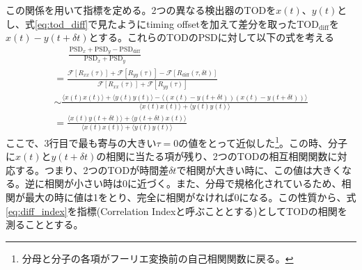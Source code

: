 この関係を用いて指標を定める。2つの異なる検出器のTODを$x(t)$、$y(t)$とし、式\eqref{eq:tod_diff}で見たようにtiming offsetを加えて差分を取った$\mathrm{TOD}_{\mathrm{diff}}$を$x(t)-y(t+\delta t)$とする。これらのTODのPSDに対して以下の式を考える
\begin{align}
  & \phantom{=}\, \frac{\mathrm{PSD}_{x} + \mathrm{PSD}_{y} - \mathrm{PSD}_{\mathrm{diff}}}{\mathrm{PSD}_{x} + \mathrm{PSD}_{y}} \label{eq:diff_index} & \\ \label{eq:diff_index2}
  & = \frac{\mathcal{F}[R_{xx}(\tau)] + \mathcal{F}[R_{yy}(\tau)] - \mathcal{F}[R_{\mathrm{diff}}(\tau,\delta t)] }{\mathcal{F}[R_{xx}(\tau)] + \mathcal{F}[R_{yy}(\tau)] }& \\
  & \sim \frac{\langle x(t)x(t)\rangle + \langle y(t)y(t)\rangle - \langle (x(t) - y(t+\delta t))(x(t) - y(t+\delta t))\rangle}{\langle x(t)x(t)\rangle + \langle y(t)y(t)\rangle}& \\
  & = \frac{\langle x(t)y(t+\delta t)\rangle + \langle y(t+\delta t)x(t)\rangle }{\langle x(t)x(t)\rangle + \langle y(t)y(t)\rangle}
\end{align}
ここで、3行目で最も寄与の大きい$\tau=0$の値をとって近似した\footnote{分母と分子の各項がフーリエ変換前の自己相関関数に戻る。}。この時、分子に$x(t)$と$y(t+\delta t)$の相関に当たる項が残り、2つのTODの相互相関関数に対応する。つまり、2つのTODが時間差$\delta t$で相関が大きい時に、この値は大きくなる。逆に相関が小さい時は0に近づく。また、分母で規格化されているため、相関が最大の時に値は1をとり、完全に相関がなければ0になる。この性質から、式\eqref{eq:diff_index}を指標(Correlation Indexと呼ぶこととする)としてTODの相関を測ることとする。

